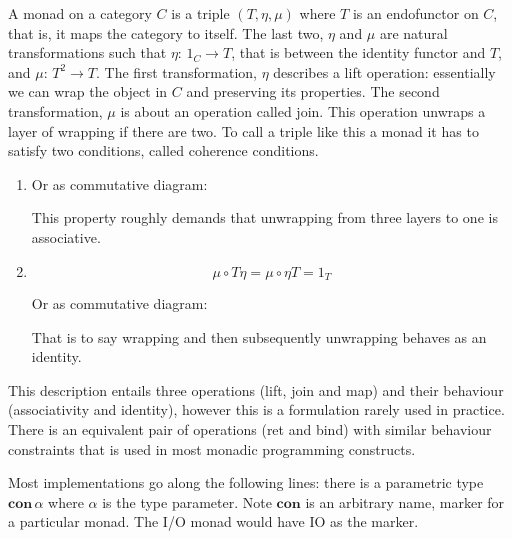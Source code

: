 \documentclass[12pt,twoside,notitlepage]{report}
\begin{document}
A monad on a category $ C $ is a triple $ (T, \eta, \mu) $ where $ T $ is an endofunctor on $ C $, that is, it maps the category to itself. The last two, $ \eta $ and $ \mu $ are natural transformations such that $ \eta:\, 1_C \rightarrow T $, that is between the identity functor and $ T $, and $ \mu:\, T^2 \rightarrow T $. The first transformation, $ \eta $ describes a lift operation: essentially we can wrap the object in $ C $ and preserving its properties. The second transformation, $ \mu $ is about an operation called join. This operation unwraps a layer of wrapping if there are two. To call a triple like this a monad it has to satisfy two conditions, called coherence conditions.
\begin{enumerate}

\item{
\iftoggle{wordcount}{}{
\[ \mu \circ T \mu = \mu \circ \mu T \]
}
Or as commutative diagram:
\begin{center}
\end{center}
This property roughly demands that unwrapping from three layers to one is associative.



}
\item{
\[ \mu \circ T\eta = \mu \circ \eta T = 1_T \]

Or as commutative diagram:
\begin{center}
\end{center}

That is to say wrapping and then subsequently unwrapping behaves as an identity.
}
\end{enumerate}

This description entails three operations (lift, join and map) and their behaviour (associativity and identity), however this is a formulation rarely used in practice. There is an equivalent pair of operations (ret and bind) with similar behaviour constraints that is used in most monadic programming constructs. 


Most implementations go along the following lines: there is a parametric type $ \textbf{con} \, \alpha $ where $ \alpha $ is the type parameter. Note $ \textbf{con} $ is an arbitrary name, marker for a particular monad. The I/O monad would have IO as the marker.
\end{document}

